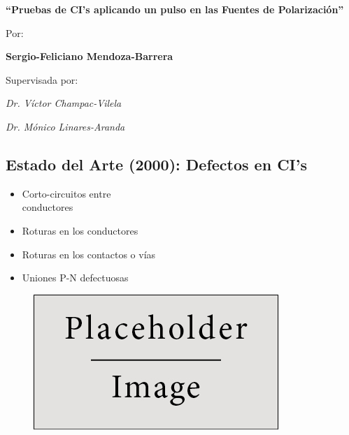\documentclass[
paper=128mm:96mm, %
fontsize=11pt, %
pagesize, %
parskip=half-, %
]{scrartcl} %
\newcommand*{\mygreen}[1]{\textcolor{mygreen}{#1}}
\newcommand*{\myblue}[1]{\textcolor{myblue}{#1}}
\newcommand*{\mybrown}[1]{\textcolor{mybrown}{#1}}
\newcommand*{\myred}[1]{\textcolor{myred}{#1}}
\theoremstyle{mythmstyle} %
\begin{document}
\textbf{``Pruebas de CI's aplicando un pulso en las Fuentes de Polarización''}

   Por:

   \textbf{Sergio-Feliciano Mendoza-Barrera}

   Supervisada por:

   \textit{Dr. Víctor Champac-Vilela}

   \textit{Dr. Mónico Linares-Aranda}

\clearpage


\subsection{Estado del Arte (2000): Defectos en CI's}

\begin{multicols}{2} %
\begin{itemize}
  \item Corto-circuitos entre\\conductores
  \item Roturas en los conductores
  \item Roturas en los contactos o vías
  \item Uniones P-N defectuosas
\end{itemize}
\end{multicols}

\begin{figure}[h]
\centering\includegraphics[width=0.4\linewidth]{placeholder}
\end{figure}



\end{document}
